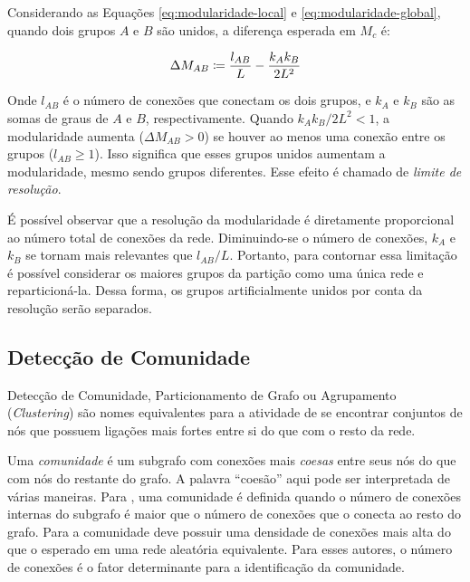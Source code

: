 \documentclass[12pt,a4paper]{article}
\begin{document}
Considerando as Equações \ref{eq:modularidade-local} e \ref{eq:modularidade-global}, quando dois grupos $A$ e $B$ são unidos, a diferença esperada em $M_c$ é:

\begin{equation}
\Delta M_{AB} \coloneqq \frac{l_{AB}}{L} - \frac{k_A k_B}{2L^2}
\end{equation}

Onde $l_{AB}$ é o número de conexões que conectam os dois grupos, e $k_A$ e $k_B$ são as somas de graus de $A$ e $B$, respectivamente. Quando $k_A k_B / 2L^2 < 1$, a modularidade aumenta ($\Delta M_{AB} > 0$) se houver ao menos uma conexão entre os grupos ($l_{AB} \geq 1$). Isso significa que esses grupos unidos aumentam a modularidade, mesmo sendo grupos diferentes. Esse efeito é chamado de \textit{limite de resolução}.

É possível observar que a resolução da modularidade é diretamente proporcional ao número total de conexões da rede. Diminuindo-se o número de conexões, $k_A$ e $k_B$ se tornam mais relevantes que $l_{AB} / L$. Portanto, para contornar essa limitação é possível considerar os maiores grupos da partição como uma única rede e reparticioná-la. Dessa forma, os grupos artificialmente unidos por conta da resolução serão separados.



\subsection{Detecção de Comunidade} \label{sec:deteccao-comunidade}

Detecção de Comunidade, Particionamento de Grafo ou Agrupamento (\textit{Clustering}) são nomes equivalentes para a atividade de se encontrar conjuntos de nós que possuem ligações mais fortes entre si do que com o resto da rede.

Uma \textit{comunidade} é um subgrafo com conexões mais \textit{coesas} entre seus nós do que com nós do restante do grafo. A palavra \enquote{coesão} aqui pode ser interpretada de várias maneiras. Para , uma comunidade é definida quando o número de conexões internas do subgrafo é maior que o número de conexões que o conecta ao resto do grafo. Para  a comunidade deve possuir uma densidade de conexões mais alta do que o esperado em uma rede aleatória equivalente. Para esses autores, o número de conexões é o fator determinante para a identificação da comunidade.
\end{document}
